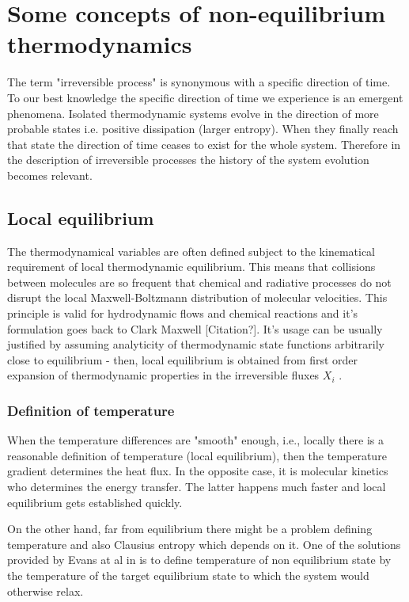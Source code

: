 \documentclass[a4paper,12pt,nofootinbib]{article}
\begin{document}
\newpage

\section{Some concepts of non-equilibrium thermodynamics}
The term "irreversible process" is synonymous with a specific direction of time.
To our best knowledge the specific direction of time we experience is an emergent phenomena.
Isolated thermodynamic systems evolve in the direction of more probable states i.e. positive dissipation (larger entropy).
When they finally reach that state the direction of time ceases to exist for the whole system. 
Therefore in the description of irreversible processes the history of the system evolution becomes relevant.


\subsection{Local equilibrium}
The thermodynamical variables are often defined subject to the kinematical requirement of local thermodynamic equilibrium. This means that collisions between molecules are so frequent that chemical and radiative processes do not disrupt the local Maxwell-Boltzmann distribution of molecular velocities. This principle is valid for hydrodynamic flows and chemical reactions and it's formulation goes back to Clark Maxwell [Citation?].
It's usage can be usually justified by assuming analyticity of thermodynamic state functions arbitrarily close to equilibrium - then, local equilibrium is obtained from first order expansion of thermodynamic properties in the irreversible fluxes ${X_i}$ \cite{Evans:2002gg}.

\subsubsection{Definition of temperature}
When the temperature differences are "smooth" enough, i.e., locally there is a reasonable definition of temperature (local equilibrium), then the temperature gradient determines the heat flux. In the opposite case, it is molecular kinetics who determines the energy transfer. The latter happens much faster and local equilibrium gets established quickly.

On the other hand, far from equilibrium there might be a problem defining temperature and also Clausius entropy which depends on it. One of the solutions provided by Evans at al in  is to define temperature of non equilibrium state by the temperature of the target equilibrium state to which the system would otherwise relax.
\end{document}
